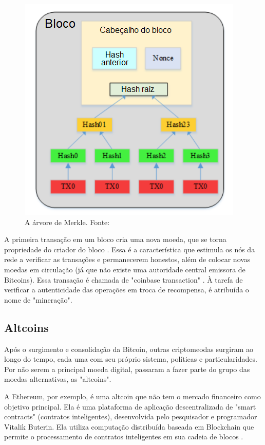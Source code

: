\documentclass[openright]{normas-utf-tex} %
\begin{document}
\begin{figure}[ht]
\centering
\includegraphics[width=.7\textwidth]{merkle.PNG}
\caption{A árvore de Merkle. Fonte: }
\label{fig:merkle}
\end{figure}

A primeira transação em um bloco cria uma nova moeda, que se torna propriedade do criador do bloco \cite{Nakamoto2008}. Essa é a característica que estimula os nós da rede a verificar as transações e permanecerem honestos, além de colocar novas moedas em circulação (já que não existe uma autoridade central emissora de Bitcoins). Essa transação é chamada de "coinbase transaction" \cite{Vujicic2018}. À tarefa de verificar a autenticidade das operações em troca de recompensa, é atribuída o nome de "mineração". 

\subsection{Altcoins}

Após o surgimento e consolidação da Bitcoin, outras criptomeodas surgiram ao longo do tempo, cada uma com seu próprio sistema, políticas e particularidades. Por não serem a principal moeda digital, passaram a fazer parte do grupo das moedas alternativas, as "altcoins".

A Ethereum, por exemplo, é uma altcoin que não tem o mercado financeiro como objetivo principal. Ela é uma plataforma de aplicação descentralizada de "smart contracts" (contratos inteligentes), desenvolvida pelo pesquisador e programador Vitalik Buterin. Ela utiliza computação distribuída baseada em Blockchain que permite o processamento de contratos inteligentes em sua cadeia de blocos \cite{Tasatanattakool2018}.
\end{document}
